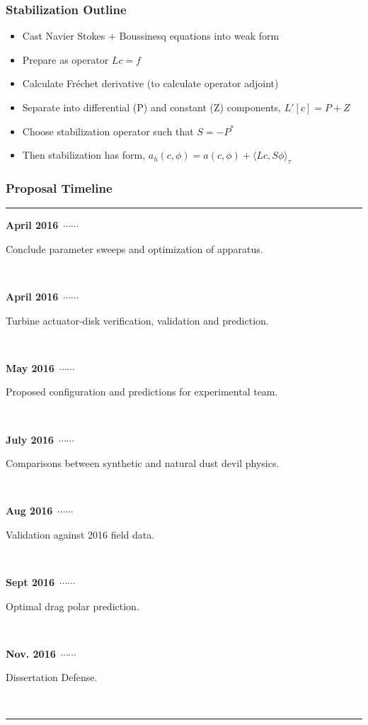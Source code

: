 \documentclass[mathserif]{beamer}
\newcommand\ytl[2]{
\parbox[b]{8em}{\hfill{\color{black}\bfseries\sffamily
#1}~$\cdots\cdots$~}\makebox[0pt][c]{$\bullet$}\vrule\quad
\parbox[c]{8.5cm}{\vspace{7pt}\color{black}\raggedright\sffamily
#2.\\[7pt]}\\[-3pt]}
\newcommand\yto[2]{
\parbox[b]{8em}{\hfill{\color{orange}\bfseries\sffamily
#1}~$\cdots\cdots$~}\makebox[0pt][c]{$\bullet$}\vrule\quad
\parbox[c]{8.5cm}{\vspace{7pt}\color{orange}\raggedright\sffamily
#2.\\[7pt]}\\[-3pt]}
\newcommand\ytb[2]{
\parbox[b]{8em}{\hfill{\color{blue}\bfseries\sffamily
#1}~$\cdots\cdots$~}\makebox[0pt][c]{$\bullet$}\vrule\quad
\parbox[c]{8.5cm}{\vspace{7pt}\color{blue}\raggedright\sffamily
#2.\\[7pt]}\\[-3pt]}
\begin{document}
%
%
\begin{frame}
\frametitle{Stabilization Outline}

\begin{itemize}
 \item Cast Navier Stokes + Boussinesq equations into weak form
 \item Prepare as operator $Lc=f$
 \item Calculate Fr\'echet derivative (to calculate operator adjoint)
 \item Separate into differential (P) and constant (Z) components,
       $L'[c] = P + Z$
 \item Choose stabilization operator such that $S = -P^*$
 \item Then stabilization has form, $a_h(c,\phi) = a(c,\phi) + \langle
       Lc,S\phi \rangle_\tau$
\end{itemize}
\end{frame}

%
%
%
\begin{frame}
\frametitle{Proposal Timeline}
\small
\begin{center}
\begin{table}
\centering
\begin{minipage}[t]{1.6\linewidth}
\color{black}
 \rule{\linewidth}{1pt}
 \yto{April 2016}{Conclude parameter sweeps and optimization of apparatus}
 \yto{April 2016}{Turbine actuator-disk verification, validation and prediction}
 \ytl{May 2016}{Proposed configuration and predictions for experimental
 team}
 \ytb{July 2016}{Comparisons between synthetic and natural dust devil physics}
 \ytl{Aug 2016}{Validation against 2016 field data}
 \ytl{Sept 2016}{Optimal drag polar prediction}
\ytl{Nov. 2016}{Dissertation Defense}
 \bigskip
 \rule{\linewidth}{1pt}%
\end{minipage}%
\end{table}
 \label{tab:prop}
\end{center}

\end{frame}
\end{document}
